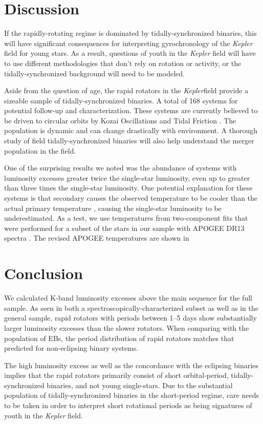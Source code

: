 \documentclass[manuscript]{aastex6}
\newcommand{\Kepler}{\mbox{\textit{Kepler}}}
\newcommand{\gvs}{\authorcomment1}
\begin{document}
\section{Discussion}
\label{sec:discussion}

If the rapidly-rotating regime is dominated by tidally-synchronized binaries,
this will have significant consequences for interpreting gyrochronology of the
\Kepler{} field for young stars. As a result, questions of youth in the
\Kepler{} field will have to use different methodologies that don't rely on
rotation or activity, or the tidally-synchronized background will need to be
modeled. 

Aside from the question of age, the rapid rotators in the \Kepler field provide
a sizeable sample of tidally-synchronized binaries. A total of 168 systems for
potential follow-up and characterization. These systems are currently believed
to be driven to circular orbits by Kozai Oscillations and Tidal Friction
\citep{Fabrycky07}. The population is dynamic and can change drastically with
environment. A thorough study of field tidally-synchronized binaries will also
help understand the merger population in the field.

One of the surprising results we noted was the abundance of systems with
luminosity excesses greater twice the single-star luminosity, even up to
greater than three times the single-star luminosity. One potential
explanation for these systems is that secondary causes the observed temperature
to be cooler than the actual primary temperature \citep{ElBadry18a}, causing the single-star
luminosity to be underestimated. As a test, we use temperatures from
two-component fits that were performed for a subset of the stars in our sample
with APOGEE DR13 spectra \citep{ElBadry18b}. The revised APOGEE temperatures are
shown in \gvs{Continue this analysis.}

\section{Conclusion}
\label{sec:conclusions}

We calculated K-band luminosity excesses above the main sequence for the full
\citet{McQuillan14} sample. As seen in both a spectroscopically-characterized
subset as well as in the general sample, rapid rotators with periods between
1--5 days show substantially larger luminosity excesses than the slower
rotators. When comparing with the population of EBs, the period distribution of
rapid rotators matches that predicted for non-eclipsing binary systems.

The high luminosity excess as well as the concordance with the eclipsing
binaries implies that the rapid rotators primarily consist of short
orbital-period, tidally-synchronized binaries, and not young
single-stars. Due to the substantial population of tidally-synchronized
binaries in the short-period regime, care needs to be taken in order to
interpret short rotational periods as being signatures of youth in the
\Kepler{} field.



\end{document}

